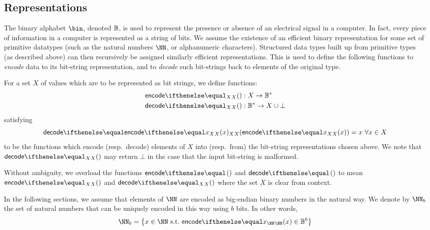 \subsection{Representations}\label{preliminaries:data-types:representation}

The binary alphabet $\bin$, denoted $\mathbb{B}$, is used to represent the presence or absence of an electrical signal in a computer. In fact, every piece of information in a computer is represented as a string of bits.
We assume the existence of an efficient binary representation for some set of primitive datatypes (such as the natural numbers $\NN$, or alphanumeric characters). Structured data types built up from primitive types (as described above) can then recursively be assigned similarly efficient representations.
This is used to define the following functions to \emph{encode} data to its bit-string representation, and to \emph{decode} such bit-strings back to elements of the original type.

\begin{definition}
  For a set $X$ of values which are to be represented as bit strings, we define functions:
  \begin{align*}
    \encode{}{X} &: X \to \BB^* \\
    \decode{}{X} &: \BB^* \to X \cup \bot
  \end{align*}
  satisfying
  \[
    \decode{\encode{x}{X}}{X} = x\ \forall x \in X
  \]
  to be the functions which encode (resp.~decode) elements of $X$ into (resp.~from) the bit-string representations chosen above.
  We note that $\decode{}{X}$ may return $\bot$ in the case that the input bit-string is malformed.
\end{definition}

Without ambiguity, we overload the functions $\encode{}{}$ and $\decode{}{}$ to mean $\encode{}{X}$ and $\decode{}{X}$ where the set $X$ is clear from context.

In the following sections, we assume that elements of $\NN$ are encoded as big-endian binary numbers in the natural way. We denote by $\NN_{b}$ the set of natural numbers that can be uniquely encoded in this way using $b$ bits. In other words,
\[
  \NN_{b} = \smallset{x \in \NN\ \suchthat\ \encode{x}{\NN} \in \BB^{b}}
\]
